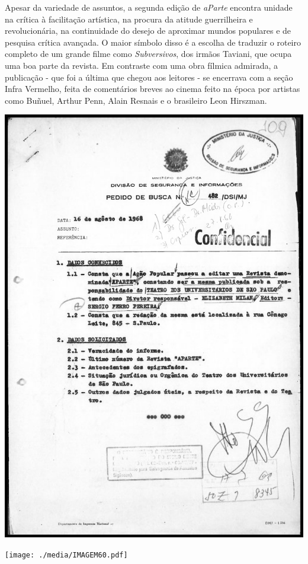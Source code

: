 Apesar da variedade de assuntos, a segunda edição de \textit{aParte}
encontra unidade na crítica à facilitação artística, na procura da
atitude guerrilheira e revolucionária, na continuidade do desejo de
aproximar mundos populares e de pesquisa crítica avançada. O maior
símbolo disso é a escolha de traduzir o roteiro completo de um grande
filme como \textit{Subversivos}, dos irmãos Taviani, que ocupa uma boa
parte da revista. Em contraste com uma obra fílmica admirada, a
publicação - que foi a última que chegou aos leitores - se encerrava com
a seção Infra Vermelho, feita de comentários breves ao cinema feito na
época por artistas como Buñuel, Arthur Penn, Alain Resnais e o
brasileiro Leon Hirszman.

\includegraphics[width=\columnwidth]{./media/IMAGEM59.jpg}


\texttt{[image: ./media/IMAGEM60.pdf]}

